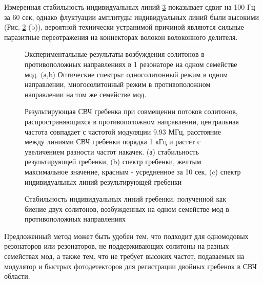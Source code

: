 Измеренная стабильность индивидуальных линий \ref{cp_one_family_stability} показывает сдвиг на 100 Гц за 60 сек, однако флуктуации амплитуды индивидуальных линий были высокими (Рис. \ref{cp_one_family_dual_comb} (b)), вероятной технически устранимой причиной являются сильные паразитные переотражения на коннекторах волокон волоконного делителя.

\begin{figure}[ht]
\begin{minipage}[ht]{1\linewidth}
\end{minipage}
\caption{Экспериментальные результаты возбуждения солитонов в противоположных направлениях в 1 резонаторе на одном семействе мод. (а,b) Оптические спектры: односолитонный режим в одном направлении, многосолитонный режим в противоположном направлении на том же семействе мод.}
\label{cp_one_family}
\end{figure}

\begin{figure}[ht]
\begin{minipage}[ht]{1\linewidth}
\end{minipage}
\caption{Результирующая СВЧ гребенка при совмещении потоков солитонов, распространяющихся в противоположном направлении, центральная частота совпадает с частотой модуляции 9.93 МГц, расстояние между линиями СВЧ гребенки порядка 1 кГц и растет с увеличением разности частот накачек. (а) стабильность результирующей гребенки, (b) спектр гребенки, желтым максимальное значение, красным - усредненное за 10 сек, (c) спектр индивидуальных линий результирующей гребенки}
\label{cp_one_family_dual_comb}
\end{figure}

\begin{figure}[ht]
\begin{minipage}[ht]{1\linewidth}
\end{minipage}
\caption{Стабильность индивидуальных линий гребенки, полученной как биение двух солитонов, возбужденных на одном семействе мод в противоположных направлениях}
\label{cp_one_family_stability}
\end{figure}

Предложенный метод может быть удобен тем, что подходит для одномодовых резонаторов или резонаторов, не поддерживающих солитоны на разных семействах мод, а также тем, что не требует высоких частот, подаваемых на модулятор и быстрых фотодетекторов для регистрации двойных гребенок в СВЧ области.


